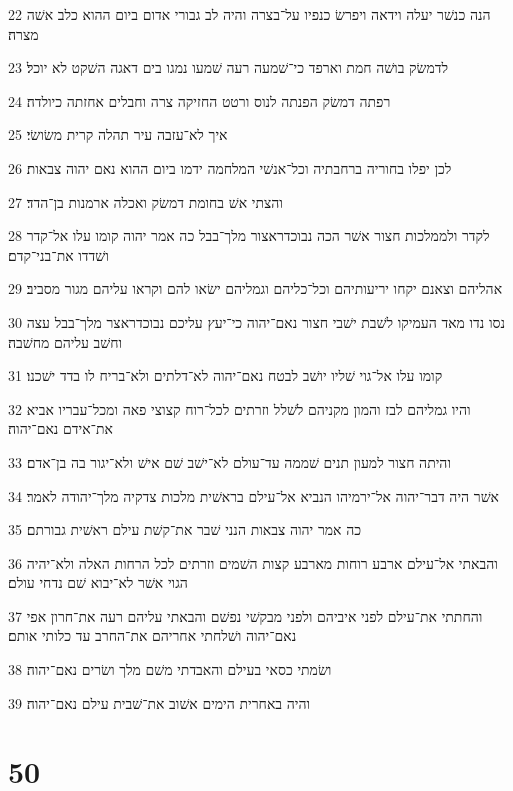 \par 22 הנה כנשׁר יעלה וידאה ויפרשׂ כנפיו על־בצרה והיה לב גבורי אדום ביום ההוא כלב אשׁה מצרה׃
\par 23 לדמשׂק בושׁה חמת וארפד כי־שׁמעה רעה שׁמעו נמגו בים דאגה השׁקט לא יוכל׃
\par 24 רפתה דמשׂק הפנתה לנוס ורטט החזיקה צרה וחבלים אחזתה כיולדה׃
\par 25 איך לא־עזבה עיר תהלה קרית משׂושׂי׃
\par 26 לכן יפלו בחוריה ברחבתיה וכל־אנשׁי המלחמה ידמו ביום ההוא נאם יהוה צבאות׃
\par 27 והצתי אשׁ בחומת דמשׂק ואכלה ארמנות בן־הדד׃
\par 28 לקדר ולממלכות חצור אשׁר הכה נבוכדראצור מלך־בבל כה אמר יהוה קומו עלו אל־קדר ושׁדדו את־בני־קדם׃
\par 29 אהליהם וצאנם יקחו יריעותיהם וכל־כליהם וגמליהם ישׂאו להם וקראו עליהם מגור מסביב׃
\par 30 נסו נדו מאד העמיקו לשׁבת ישׁבי חצור נאם־יהוה כי־יעץ עליכם נבוכדראצר מלך־בבל עצה וחשׁב עליהם מחשׁבה׃
\par 31 קומו עלו אל־גוי שׁליו יושׁב לבטח נאם־יהוה לא־דלתים ולא־בריח לו בדד ישׁכנו׃
\par 32 והיו גמליהם לבז והמון מקניהם לשׁלל וזרתים לכל־רוח קצוצי פאה ומכל־עבריו אביא את־אידם נאם־יהוה׃
\par 33 והיתה חצור למעון תנים שׁממה עד־עולם לא־ישׁב שׁם אישׁ ולא־יגור בה בן־אדם׃
\par 34 אשׁר היה דבר־יהוה אל־ירמיהו הנביא אל־עילם בראשׁית מלכות צדקיה מלך־יהודה לאמר׃
\par 35 כה אמר יהוה צבאות הנני שׁבר את־קשׁת עילם ראשׁית גבורתם׃
\par 36 והבאתי אל־עילם ארבע רוחות מארבע קצות השׁמים וזרתים לכל הרחות האלה ולא־יהיה הגוי אשׁר לא־יבוא שׁם נדחי עולם׃
\par 37 והחתתי את־עילם לפני איביהם ולפני מבקשׁי נפשׁם והבאתי עליהם רעה את־חרון אפי נאם־יהוה ושׁלחתי אחריהם את־החרב עד כלותי אותם׃
\par 38 ושׂמתי כסאי בעילם והאבדתי משׁם מלך ושׂרים נאם־יהוה׃
\par 39 והיה באחרית הימים אשׁוב את־שׁבית עילם נאם־יהוה׃

\chapter{50}

